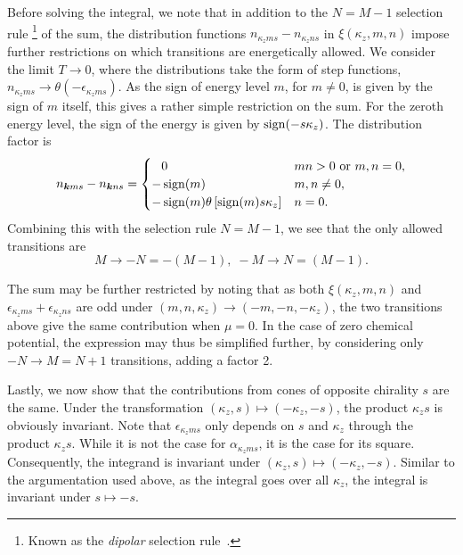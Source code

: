 Before solving the integral, we note that in addition to the \( {N = M - 1} \) selection rule%
\footnote{Known as the \emph{dipolar} selection rule~\cite{tchoumakovMagneticFieldInducedRelativisticProperties2016}.} %
of the sum, the distribution functions \( n_{\kappa_z m s} - n_{\kappa_z n s} \) in \( \xi(\kappa_z, m, n) \) impose further restrictions on which transitions are energetically allowed.
We consider the limit \( T \to 0 \), where the distributions take the form of step functions, \( n_{\kappa_z m s} \to \theta(-\epsilon_{\kappa_z m s}) \).
As the sign of energy level \( m \), for \( m \neq 0 \), is given by the sign of \( m \) itself, this gives a rather simple restriction on the sum.
For the zeroth energy level, the sign of the energy is given by \( \operatorname{sign}(-s\kappa_z) \).
The distribution factor is
\begin{equation}
  \label{eq:92}
  n_{\bm{k} m s} - n_{\bm{k} n s} =
  \begin{cases}
    \phantom{-} 0 & m n > 0 \text{ or  } m,n = 0,\\
    - \operatorname{sign}(m) & m,n \neq 0,\\
    -\operatorname{sign}(m) \theta\left[\operatorname{sign}(m) s \kappa_z\right] & n = 0.
  \end{cases}
\end{equation}
Combining this with the selection rule \( N=M-1 \), we see that the only allowed transitions are
\[ M \to -N = -(M-1), \; -M \to N = (M-1). \]

The sum may be further restricted by noting that as both \( \xi(\kappa_z, m, n) \) and \( \epsilon_{\kappa_z m s} + \epsilon_{\kappa_z n s} \) are odd under \( (m, n, \kappa_z) \to (-m, -n, -\kappa_z) \), the two transitions above give the same contribution when \( \mu = 0 \).
In the case of zero chemical potential, the expression may thus be simplified further, by considering only \( -N \to M = N + 1\) transitions, adding a factor 2.

Lastly, we now show that the contributions from cones of opposite chirality \( s \) are the same.
Under the transformation \( (\kappa_z, s) \mapsto (-\kappa_z, -s) \), the product \( \kappa_z s \) is obviously invariant.
Note that \( \epsilon_{\kappa_z m s} \) only depends on \( s \) and \( \kappa_z \) through the product \( \kappa_z s \).
While it is not the case for \( \alpha_{\kappa_z m s} \), it is the case for its square.
Consequently, the integrand is invariant under \( (\kappa_z, s) \mapsto (-\kappa_z, -s) \).
Similar to the argumentation used above, as the integral goes over all \( \kappa_z \), the integral is invariant under \( s \mapsto -s \).

